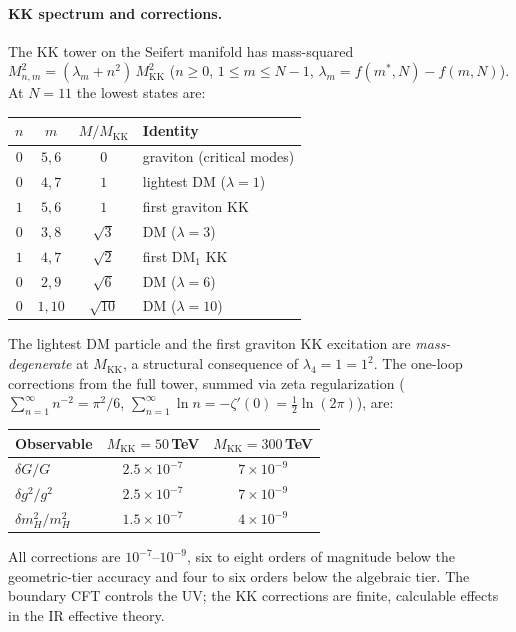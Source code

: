 \paragraph{KK spectrum and corrections.}
The KK tower on the Seifert manifold has mass-squared
$M^2_{n,m} = (\lambda_m + n^2)\,M_{\mathrm{KK}}^2$
($n \ge 0$, $1 \le m \le N{-}1$,
$\lambda_m = f(m^*,N) - f(m,N)$).
At $N = 11$ the lowest states are:
\begin{center}\small
\begin{tabular}{cccl}
\toprule
$n$ & $m$ & $M/M_{\mathrm{KK}}$ & Identity \\
\midrule
$0$ & $5,6$ & $0$ & graviton (critical modes) \\
$0$ & $4,7$ & $1$ & lightest DM ($\lambda = 1$) \\
$1$ & $5,6$ & $1$ & first graviton KK \\
$0$ & $3,8$ & $\sqrt{3}$ & DM ($\lambda = 3$) \\
$1$ & $4,7$ & $\sqrt{2}$ & first DM$_1$ KK \\
$0$ & $2,9$ & $\sqrt{6}$ & DM ($\lambda = 6$) \\
$0$ & $1,10$ & $\sqrt{10}$ & DM ($\lambda = 10$) \\
\bottomrule
\end{tabular}
\end{center}
The lightest DM particle and the first graviton KK
excitation are \emph{mass-degenerate} at $M_{\mathrm{KK}}$, a structural consequence of $\lambda_4 = 1 = 1^2$.
The one-loop corrections from the full tower, summed
via zeta regularization
($\sum_{n=1}^\infty n^{-2} = \pi^2/6$,
$\sum_{n=1}^\infty \ln n = -\zeta'(0) = \tfrac{1}{2}\ln(2\pi)$),
are:
\begin{center}\small
\begin{tabular}{lcc}
\toprule
Observable & $M_{\mathrm{KK}} = 50$\,TeV
  & $M_{\mathrm{KK}} = 300$\,TeV \\
\midrule
$\delta G/G$ & $2.5 \times 10^{-7}$ & $7 \times 10^{-9}$ \\
$\delta g^2/g^2$ & $2.5 \times 10^{-7}$ & $7 \times 10^{-9}$ \\
$\delta m_H^2/m_H^2$ & $1.5 \times 10^{-7}$ & $4 \times 10^{-9}$ \\
\bottomrule
\end{tabular}
\end{center}
All corrections are $10^{-7}$--$10^{-9}$, six to eight
orders of magnitude below the geometric-tier accuracy
and four to six orders below the algebraic tier.
The boundary CFT controls the UV; the KK corrections are
finite, calculable effects in the IR effective theory.


